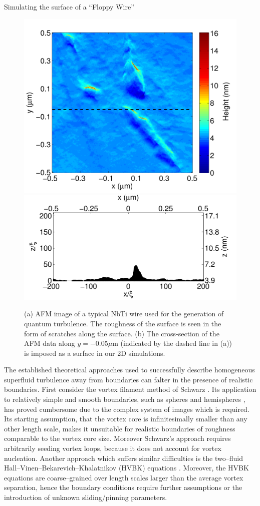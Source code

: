 \begin{chapter}{\label{cha:afm}Simulating the surface of a ``Floppy Wire''}
\begin{figure}[t]
\includegraphics[width=0.45\linewidth]{./afm/figures/afm}
\includegraphics[width=0.45\linewidth]{./afm/figures/xz-vs-mmnm}
\caption{\label{fig:afmimg} (a) AFM image of a typical NbTi wire used for the generation of quantum turbulence.  The roughness of the surface is seen in the form of scratches along the surface. (b)  The cross-section of the AFM data along $y = -0.05 \mu$m (indicated by the dashed line in (a)) is imposed as a surface in our 2D simulations.}  
\end{figure}
The established theoretical approaches used to successfully describe
homogeneous superfluid turbulence away from boundaries can falter in the presence of realistic boundaries.
First consider the vortex filament method of Schwarz
\cite{Schwarz,Hanninen-PNAS}. Its application to relatively simple and smooth
boundaries, such as spheres \cite{Hanninen-sphere,Kivotides-sphere} and
hemispheres \cite{Schwarz-bump}, has proved
cumbersome due to the complex system of images which is required.
Its starting assumption, that the vortex core
is infinitesimally smaller than any other length scale, makes it
unsuitable for realistic boundaries of roughness comparable to
the vortex core size.  Moreover Schwarz's approach requires arbitrarily seeding
vortex loops, because it does not account for vortex nucleation.
Another approach which suffers similar difficulties \cite{Henderson} is
the two--fluid Hall--Vinen--Bekarevich--Khalatnikov (HVBK)
equations \cite{Salort2011,Salort2012}. Moreover, the HVBK equations are coarse--grained over
length scales larger than the average vortex separation, hence the
boundary conditions require further assumptions or the introduction of
unknown sliding/pinning parameters.


\end{chapter}
